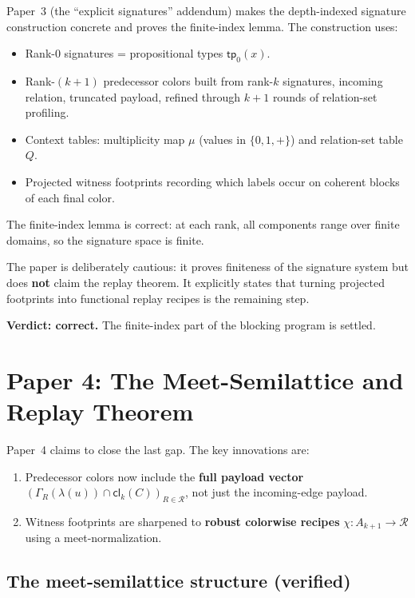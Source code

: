 \documentclass[a4paper,11pt]{article}
\theoremstyle{definition}
\newcommand{\cl}{\ensuremath{\mathsf{cl}}}
\newcommand{\Roles}{\ensuremath{\mathcal{R}}}
\begin{document}
Paper~3 (the ``explicit signatures'' addendum) makes the depth-indexed
signature construction concrete and proves the finite-index lemma.
The construction uses:
\begin{itemize}[nosep]
\item Rank-0 signatures = propositional types $\mathsf{tp}_0(x)$.
\item Rank-$(k{+}1)$ predecessor colors built from rank-$k$
  signatures, incoming relation, truncated payload, refined through
  $k{+}1$ rounds of relation-set profiling.
\item Context tables: multiplicity map $\mu$ (values in $\{0, 1,
  +\}$) and relation-set table~$Q$.
\item Projected witness footprints recording which labels occur on
  coherent blocks of each final color.
\end{itemize}

The finite-index lemma is correct: at each rank, all components range
over finite domains, so the signature space is finite.

The paper is deliberately cautious: it proves finiteness of the
signature system but does \textbf{not} claim the replay theorem.  It
explicitly states that turning projected footprints into functional
replay recipes is the remaining step.

\textbf{Verdict: correct.}  The finite-index part of the blocking
program is settled.


\section{Paper 4: The Meet-Semilattice and Replay Theorem}
\label{sec:paper4}

Paper~4 claims to close the last gap.  The key innovations are:
\begin{enumerate}[nosep]
\item Predecessor colors now include the \textbf{full payload vector}
  $(\Gamma_R(\lambda(u)) \cap \cl_k(C))_{R \in \Roles}$, not just
  the incoming-edge payload.
\item Witness footprints are sharpened to \textbf{robust colorwise
  recipes} $\chi : A_{k+1} \to \Roles$ using a meet-normalization.
\end{enumerate}

\subsection{The meet-semilattice structure (verified)}
\label{sec:meet}
\end{document}
